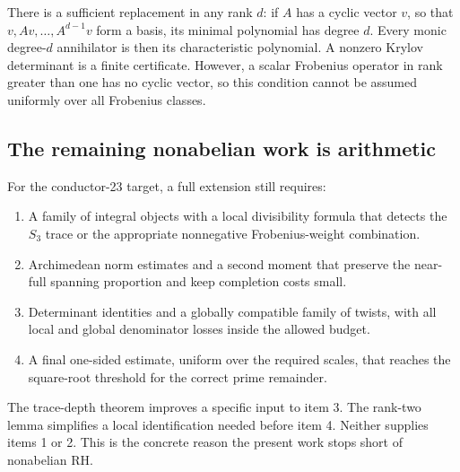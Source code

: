 There is a sufficient replacement in any rank \(d\): if \(A\) has a
cyclic vector \(v\), so that \(v,Av,\ldots,A^{d-1}v\) form a basis,
its minimal polynomial has degree \(d\). Every monic degree-\(d\)
annihilator is then its characteristic polynomial. A nonzero Krylov
determinant is a finite certificate. However, a scalar Frobenius
operator in rank greater than one has no cyclic vector, so this
condition cannot be assumed uniformly over all Frobenius classes.

\subsection{The remaining nonabelian work is arithmetic}

For the conductor-23 target, a full extension still requires:
\begin{enumerate}
\item A family of integral objects with a local divisibility formula
that detects the \(S_3\) trace or the appropriate nonnegative
Frobenius-weight combination.
\item Archimedean norm estimates and a second moment that preserve the
near-full spanning proportion and keep completion costs small.
\item Determinant identities and a globally compatible family of twists,
with all local and global denominator losses inside the allowed budget.
\item A final one-sided estimate, uniform over the required scales,
that reaches the square-root threshold for the correct prime remainder.
\end{enumerate}
The trace-depth theorem improves a specific input to item 3.
The rank-two lemma simplifies a local identification needed before
item 4. Neither supplies items 1 or 2. This is the concrete reason the
present work stops short of nonabelian RH.
